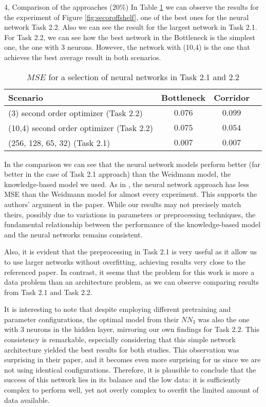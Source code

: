\begin{task}{4, Comparison of the approaches (20\%)}
In Table \ref{Tab:mse-nn} we can observe the results for the experiment of Figure \ref{fig:secoroffshelf}, one of the best ones for the neural network Task 2.2. Also we can see the result for the largest network in Task 2.1.  For Task 2.2, we can see how the best network in the Bottleneck is the simplest one, the one with 3 neurons. However, the network with (10,4) is the one that achieves the best average result in both scenarios.


\begin{table}[H]
\centering
\begin{tabular}{ |l|c|c|c| }
\hline
Scenario & Bottleneck & Corridor\\
\hline
(3) second order optimizer (Task 2.2) & $0.076$ & $0.099$\\
\hline
(10,4) second order optimizer (Task 2.2) & $0.075$ & $0.054$\\
\hline
(256, 128, 65, 32) (Task 2.1)  & $0.007$ & $0.007$\\
\hline
\end{tabular}
\caption{$MSE$ for a selection of neural networks in Task 2.1 and 2.2}
\label{Tab:mse-nn}
\end{table}

In the comparison we can see that the neural network models perform better (far better in the case of Task 2.1 approach) than the Weidmann model, the knowledge-based model we used. As in \cite{tordeux2020prediction}, the neural network approach has less MSE than the Weidmann model for almost every experiment. This supports the authors' argument in the paper. While our results may not precisely match theirs, possibly due to variations in parameters or preprocessing techniques, the fundamental relationship between the performance of the knowledge-based model and the neural networks remains consistent.

Also, it is evident that the preprocessing in Task 2.1 is very useful as it allow us to use larger networks without overfitting, achieving results very close to the referenced paper. In contrast, it seems that the problem for this work is more a data problem than an architecture problem, as we can observe comparing results from Task 2.1 and Task 2.2.

It is interesting to note that despite employing different pretraining and parameter configurations, the optimal model from their \(NN_3\) was also the one with 3 neurons in the hidden layer, mirroring our own findings for Task 2.2. This consistency is remarkable, especially considering that this simple network architecture yielded the best results for both studies. This observation was surprising in their paper, and it becomes even more surprising for us since we are not using identical configurations. Therefore, it is plausible to conclude that the success of this network lies in its balance and the low data: it is sufficiently complex to perform well, yet not overly complex to overfit the limited amount of data available.


\end{task}
